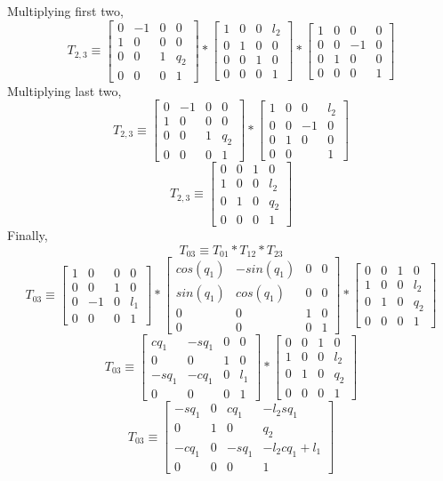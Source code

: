 \documentclass[12pt]{article}
\newcommand{\rz}[1]{\begin{bmatrix} cos(#1) & -sin(#1) & 0 & 0 \\ sin(#1) & cos(#1) & 0 & 0 \\ 0 & 0 & 1 & 0 \\ 0 & 0 & 0 & 1 \end{bmatrix}}
\newcommand{\trans}[3]{\begin{bmatrix} 1 & 0 & 0 & #1 \\ 0 & 1 & 0 & #2 \\ 0 & 0 & 1 & #3 \\ 0 & 0 & 0 & 1 \end{bmatrix}}
\begin{document}
Multiplying first two,
\[
  T_{2,3}
  \equiv
  \begin{bmatrix} 0 & -1 & 0 & 0 \\ 1 & 0 & 0 & 0 \\ 0 & 0 & 1 & q_2 \\ 0 & 0 & 0 & 1 \end{bmatrix}
  * \trans{l_2}{0}{0}
  * \begin{bmatrix} 1 & 0 & 0 & 0 \\ 0 & 0 & -1 & 0 \\ 0 & 1 & 0 & 0 \\ 0 & 0 & 0 & 1 \end{bmatrix}
\]
Multiplying last two,
\[
  T_{2,3}
  \equiv
  \begin{bmatrix} 0 & -1 & 0 & 0 \\ 1 & 0 & 0 & 0 \\ 0 & 0 & 1 & q_2 \\ 0 & 0 & 0 & 1 \end{bmatrix}
  * \begin{bmatrix} 1 & 0 & 0 & l_2 \\ 0 & 0 & -1 & 0 \\ 0 & 1 & 0 & 0 \\ 0 & 0 &  & 1 \end{bmatrix}
\]
\[
  T_{2,3}
  \equiv
  \begin{bmatrix} 0 & 0 & 1 & 0 \\ 1 & 0 & 0 & l_2 \\ 0 & 1 & 0 & q_2 \\ 0 & 0 & 0 & 1 \end{bmatrix}
\]
Finally,
\[
  T_{03} \equiv
  T_{01}
  * T_{12}
  * T_{23}
\]
\[
  T_{03} \equiv
  \begin{bmatrix} 1 & 0 & 0 & 0 \\ 0 & 0 & 1 & 0 \\ 0 & -1 & 0 & l_1 \\ 0 & 0 & 0 & 1 \end{bmatrix}
  * \rz{q_1}
  * \begin{bmatrix} 0 & 0 & 1 & 0 \\ 1 & 0 & 0 & l_2 \\ 0 & 1 & 0 & q_2 \\ 0 & 0 & 0 & 1 \end{bmatrix}
\]
\[
  T_{03} \equiv
  \begin{bmatrix} cq_1 & -sq_1 & 0 & 0 \\ 0 & 0 & 1 & 0 \\ -sq_1 & -cq_1 & 0 & l_1 \\ 0 & 0 & 0 & 1 \end{bmatrix}
  * \begin{bmatrix} 0 & 0 & 1 & 0 \\ 1 & 0 & 0 & l_2 \\ 0 & 1 & 0 & q_2 \\ 0 & 0 & 0 & 1 \end{bmatrix}
\]
\[
  T_{03} \equiv
  \begin{bmatrix} -sq_1 & 0 & cq_1 & -l_2sq_1 \\ 0 & 1 & 0 & q_2 \\ -cq_1 & 0 & -sq_1 & -l_2cq_1 + l_1 \\ 0 & 0 & 0 & 1 \end{bmatrix}
\]
\end{document}

